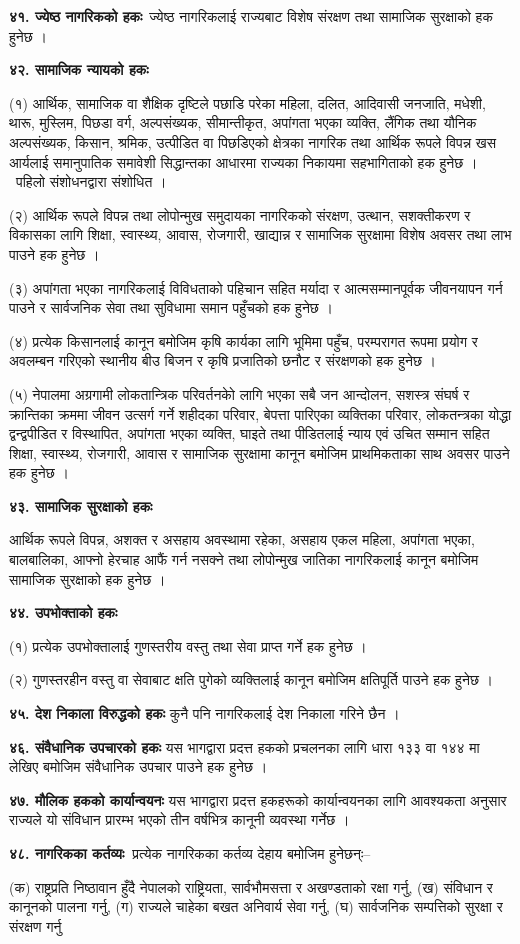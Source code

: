 \textbf{४१. ज्येष्ठ नागरिकको हकः} ज्येष्ठ नागरिकलाई राज्यबाट विशेष संरक्षण तथा सामाजिक सुरक्षाको हक हुनेछ ।

\textbf{४२. सामाजिक न्यायको हकः}

(१) आर्थिक, सामाजिक वा शैक्षिक दृष्टिले पछाडि परेका महिला, दलित, आदिवासी जनजाति, मधेशी, थारू, मुस्लिम, पिछडा वर्ग, अल्पसंख्यक, सीमान्तीकृत, अपांगता भएका व्यक्ति, लैंगिक तथा यौनिक अल्पसंख्यक, किसान, श्रमिक, उत्पीडित वा पिछडिएको क्षेत्रका नागरिक तथा आर्थिक रूपले विपन्न खस आर्यलाई समानुपातिक समावेशी सिद्धान्तका आधारमा राज्यका निकायमा सहभागिताको हक हुनेछ । पहिलो संशोधनद्वारा संशोधित ।

(२) आर्थिक रूपले विपन्न तथा लोपोन्मुख समुदायका नागरिकको संरक्षण, उत्थान, सशक्तीकरण र विकासका लागि शिक्षा, स्वास्थ्य, आवास, रोजगारी, खाद्यान्न र सामाजिक सुरक्षामा विशेष अवसर तथा लाभ पाउने हक हुनेछ ।

(३) अपांगता भएका नागरिकलाई विविधताको पहिचान सहित मर्यादा र आत्मसम्मानपूर्वक जीवनयापन गर्न पाउने र सार्वजनिक सेवा तथा
सुविधामा समान पहुँचको हक हुनेछ ।

(४) प्रत्येक किसानलाई कानून बमोजिम कृषि कार्यका लागि भूमिमा पहुँच, परम्परागत रूपमा प्रयोग र अवलम्बन गरिएको स्थानीय बीउ बिजन र कृषि प्रजातिको छनौट र संरक्षणको हक हुनेछ ।

(५) नेपालमा अग्रगामी लोकतान्त्रिक परिवर्तनकोे लागि भएका सबै जन आन्दोलन, सशस्त्र संघर्ष र क्रान्तिका क्रममा जीवन उत्सर्ग गर्ने
शहीदका परिवार, बेपत्ता पारिएका व्यक्तिका परिवार, लोकतन्त्रका योद्धा द्वन्द्वपीडित र विस्थापित, अपांगता भएका व्यक्ति, घाइते तथा पीडितलाई न्याय एवं उचित सम्मान सहित शिक्षा, स्वास्थ्य, रोजगारी, आवास र सामाजिक सुरक्षामा कानून बमोजिम प्राथमिकताका साथ अवसर पाउने हक हुनेछ ।

\textbf{४३. सामाजिक सुरक्षाको हकः}

आर्थिक रूपले विपन्न, अशक्त र असहाय अवस्थामा रहेका, असहाय एकल महिला, अपांगता भएका, बालबालिका, आफ्नो हेरचाह आफैं गर्न नसक्ने तथा लोपोन्मुख जातिका नागरिकलाई कानून बमोजिम सामाजिक सुरक्षाको हक हुनेछ ।

\textbf{४४. उपभोक्ताको हकः}

(१) प्रत्येक उपभोक्तालाई गुणस्तरीय वस्तु तथा सेवा प्राप्त गर्ने हक हुनेछ ।

(२) गुणस्तरहीन वस्तु वा सेवाबाट क्षति पुगेको व्यक्तिलाई कानून बमोजिम क्षतिपूर्ति पाउने हक हुनेछ ।

\textbf{४५. देश निकाला विरुद्धको हकः} कुनै पनि नागरिकलाई देश निकाला गरिने छैन ।

\textbf{४६. संवैधानिक उपचारको हकः} यस भागद्वारा प्रदत्त हकको प्रचलनका लागि धारा १३३ वा १४४ मा लेखिए बमोजिम संवैधानिक उपचार पाउने हक हुनेछ ।

\textbf{४७. मौलिक हकको कार्यान्वयनः} यस भागद्वारा प्रदत्त हकहरूको कार्यान्वयनका लागि आवश्यकता अनुसार राज्यले यो संविधान प्रारम्भ भएको तीन वर्षभित्र कानूनी व्यवस्था गर्नेछ ।

\textbf{४८. नागरिकका कर्तव्यः }प्रत्येक नागरिकका कर्तव्य देहाय बमोजिम हुनेछन्ः–

(क) राष्ट्रप्रति निष्ठावान हुँदै नेपालको राष्ट्रियता, सार्वभौमसत्ता र अखण्डताको रक्षा गर्नु,
(ख) संविधान र कानूनको पालना गर्नु,
(ग) राज्यले चाहेका बखत अनिवार्य सेवा गर्नु,
(घ) सार्वजनिक सम्पत्तिको सुरक्षा र संरक्षण गर्नु